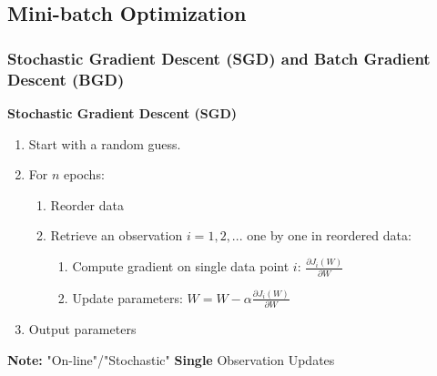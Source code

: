 \documentclass[11pt,a4paper]{article}
\begin{document}
\subsection{ Mini-batch Optimization}
\subsubsection{Stochastic Gradient Descent (SGD) and Batch Gradient Descent (BGD)}
\textbf{Stochastic Gradient Descent (SGD)}
\begin{enumerate}
    \item Start with a random guess.
    \item For $n$ epochs:
    \begin{enumerate}[1)]
        \item Reorder data
        \item Retrieve an observation $i=1,2,...$ one by one in reordered data:
        \begin{enumerate}[(1)]
            \item Compute gradient on single data point $i$: $\frac{\partial J_i(W)}{\partial W}$
            \item Update parameters:
            $W=W-\alpha \frac{\partial J_i(W)}{\partial W}$
        \end{enumerate}
    \end{enumerate}
    \item Output parameters
\end{enumerate}
\textbf{Note:} "On-line"/"Stochastic" \textbf{Single} Observation Updates
\end{document}
